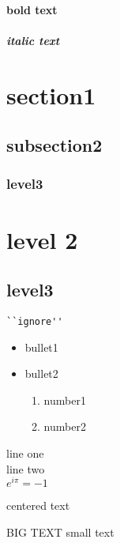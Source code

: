 \documentclass[10pt,a4paper]{article}
\begin{document}
\paragraph{\textbf{bold text}}
\paragraph{\textit{italic text}}
\section{section1}
\subsection{subsection2}
\subsubsection{level3}
\section{level 2}
\subsection{level3}
\begin{verbatim}
``ignore''
\end{verbatim}
\begin{itemize}
\item bullet1
\item bullet2
\begin{enumerate}
\item number1
\item number2
\end{enumerate}
\end{itemize}
line one \\ line two \\
$e^{i \pi} = -1$
\begin{center}
centered text
\end{center}
{\large BIG TEXT}
{\small small text}
\end{document}
